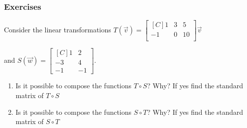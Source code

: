\subsubsection{Exercises}
\begin{exercise}
Consider the linear transformations 
$T(\vec{v})=\begin{bmatrix*}[C]
1  & 3  & 5 \\
-1 & 0  & 10 \\
\end{bmatrix*}\vec{v}$

and $S(\vec{w})=\begin{bmatrix*}[C]
1 & 2 \\
-3 & 4 \\
-1 & -1
\end{bmatrix*}$.
\begin{enumerate}
\item Is it possible to compose the functions $T \circ S$? Why? If yes find the standard matrix of $T \circ S$
\item Is it possible to compose the functions $S \circ T$? Why? If yes find the standard matrix of $S \circ T$
\end{enumerate}
\end{exercise}



